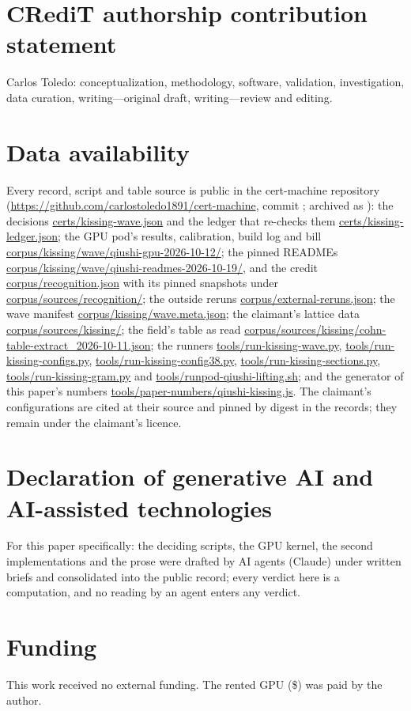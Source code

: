 \documentclass[preprint,11pt,authoryear,a4paper]{elsarticle}
\begin{document}
\section*{CRediT authorship contribution statement}
Carlos Toledo: conceptualization, methodology, software, validation, investigation, data curation, writing---original draft, writing---review and editing.

\section*{Data availability}
Every record, script and table source is public in the cert-machine repository (\url{https://github.com/carlostoledo1891/cert-machine}, commit \QkCommit; archived as \citealp{CMArchive}): the decisions \url{certs/kissing-wave.json} and the ledger that re-checks them \url{certs/kissing-ledger.json}; the GPU pod's results, calibration, build log and bill \url{corpus/kissing/wave/qiushi-gpu-2026-10-12/}; the pinned READMEs \url{corpus/kissing/wave/qiushi-readmes-2026-10-19/}, and the credit \url{corpus/recognition.json} with its pinned snapshots under \url{corpus/sources/recognition/}; the outside reruns \url{corpus/external-reruns.json}; the wave manifest \url{corpus/kissing/wave.meta.json}; the claimant's lattice data \url{corpus/sources/kissing/}; the field's table as read \url{corpus/sources/kissing/cohn-table-extract_2026-10-11.json}; the runners \url{tools/run-kissing-wave.py}, \url{tools/run-kissing-configs.py}, \url{tools/run-kissing-config38.py}, \url{tools/run-kissing-sections.py}, \url{tools/run-kissing-gram.py} and \url{tools/runpod-qiushi-lifting.sh}; and the generator of this paper's numbers \url{tools/paper-numbers/qiushi-kissing.js}. The claimant's configurations are cited at their source \citep{QiushiRelease} and pinned by digest in the records; they remain under the claimant's licence.

\section*{Declaration of generative AI and AI-assisted technologies}
\cmaideclaration{} For this paper specifically: the deciding scripts, the GPU kernel, the second implementations and the prose were drafted by AI agents (Claude) under written briefs and consolidated into the public record; every verdict here is a computation, and no reading by an agent enters any verdict.

\section*{Funding}
This work received no external funding. The rented GPU (\$\MtKwGpuCost) was paid by the author.
\end{document}
